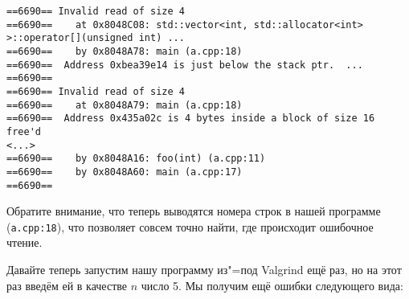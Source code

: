 {\footnotesize
\begin{verbatim}
==6690== Invalid read of size 4                                                                                                                                                                                                                                                
==6690==    at 0x8048C08: std::vector<int, std::allocator<int> >::operator[](unsigned int) ...
==6690==    by 0x8048A78: main (a.cpp:18)                                                                                                                                                                                                                                      
==6690==  Address 0xbea39e14 is just below the stack ptr.  ...
==6690==                                                                                                                                                                                                                                                                       
==6690== Invalid read of size 4                                                                                                                                                                                                                                                
==6690==    at 0x8048A79: main (a.cpp:18)                                                                                                                                                                                                                                      
==6690==  Address 0x435a02c is 4 bytes inside a block of size 16 free'd                                                                                                                                                                                                        
<...>
==6690==    by 0x8048A16: foo(int) (a.cpp:11)
==6690==    by 0x8048A60: main (a.cpp:17)
==6690== 
\end{verbatim}
\par}

Обратите внимание, что теперь выводятся номера строк в нашей программе (\verb`a.cpp:18`), что позволяет совсем точно найти, где происходит ошибочное чтение.

Давайте теперь запустим нашу программу из"=под Valgrind ещё раз, но на этот раз введём ей в качестве $n$ число 5. Мы получим ещё ошибки следующего вида:

